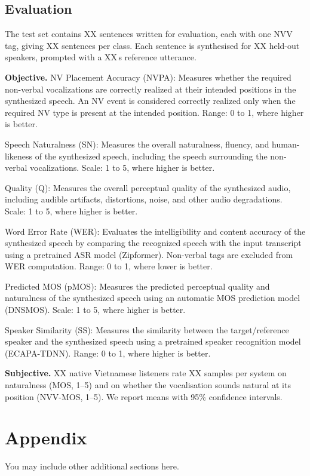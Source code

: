 \documentclass{article} %
\begin{document}
\subsection{Evaluation}
The test set contains XX sentences written for evaluation, each with one NVV tag, giving XX
sentences per class. Each sentence is synthesised for XX held-out speakers, prompted with
a XX\,s reference utterance.

\textbf{Objective.} 
NV Placement Accuracy (NVPA): Measures whether the required non-verbal vocalizations are correctly realized at their intended positions in the synthesized speech. An NV event is considered correctly realized only when the required NV type is present at the intended position. Range: 0 to 1, where higher is better.

Speech Naturalness (SN): Measures the overall naturalness, fluency, and human-likeness of the synthesized speech, including the speech surrounding the non-verbal vocalizations. Scale: 1 to 5, where higher is better.

Quality (Q): Measures the overall perceptual quality of the synthesized audio, including audible artifacts, distortions, noise, and other audio degradations. Scale: 1 to 5, where higher is better.

Word Error Rate (WER): Evaluates the intelligibility and content accuracy of the synthesized speech by comparing the recognized speech with the input transcript using a pretrained ASR model (Zipformer). Non-verbal tags are excluded from WER computation. Range: 0 to 1, where lower is better.

Predicted MOS (pMOS): Measures the predicted perceptual quality and naturalness of the synthesized speech using an automatic MOS prediction model (DNSMOS). Scale: 1 to 5, where higher is better.

Speaker Similarity (SS): Measures the similarity between the target/reference speaker and the synthesized speech using a pretrained speaker recognition model (ECAPA-TDNN). Range: 0 to 1, where higher is better.

\textbf{Subjective.} XX native Vietnamese listeners rate XX samples per system on
naturalness (MOS, 1--5) and on whether the vocalisation sounds natural at its position
(NVV-MOS, 1--5). We report means with 95\% confidence intervals.
\appendix
\section{Appendix}
You may include other additional sections here.
\end{document}
